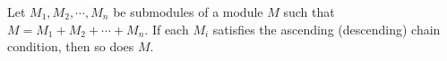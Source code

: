Let $M_1, M_2, \cdots, M_n$ be submodules of a module $M$ such that $M = M_1 + M_2 + \cdots + M_n$. If each $M_i$ satisfies the ascending (descending) chain condition, then so does $M$.
